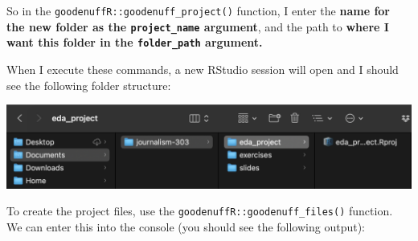 \documentclass[letterpaper,9pt,twoside,]{pinp}
\begin{document}
So in the \texttt{goodenuffR::goodenuff\_project()} function, I enter
the \textbf{name for the new folder as the \texttt{project\_name}
argument}, and the path to \textbf{where I want this folder in the
\texttt{folder\_path} argument.}

\begin{Shaded}
\begin{Highlighting}[]
\SpecialCharTok{::}\NormalTok{(} \NormalTok{, }
     \NormalTok{)}
\end{Highlighting}
\end{Shaded}

When I execute these commands, a new RStudio session will open and I
should see the following folder structure:

\begin{Shaded}
\begin{Highlighting}[]
\KeywordTok{|}
  \KeywordTok{|}\ExtensionTok{{-}{-}}
          \KeywordTok{|}\ExtensionTok{{-}{-}}
  \KeywordTok{|}\ExtensionTok{{-}{-}}
  \KeywordTok{|}\ExtensionTok{{-}{-}}
\end{Highlighting}
\end{Shaded}

\begin{flushleft}\includegraphics[width=0.7\linewidth]{img/proj-folder} \end{flushleft}

To create the project files, use the
\texttt{goodenuffR::goodenuff\_files()} function. We can enter this into
the console (you should see the following output):

\begin{Shaded}
\begin{Highlighting}[]
\SpecialCharTok{::}\NormalTok{()}
\CommentTok{\# }
\CommentTok{\# ==================================================}
\end{Highlighting}
\end{Shaded}
\end{document}

